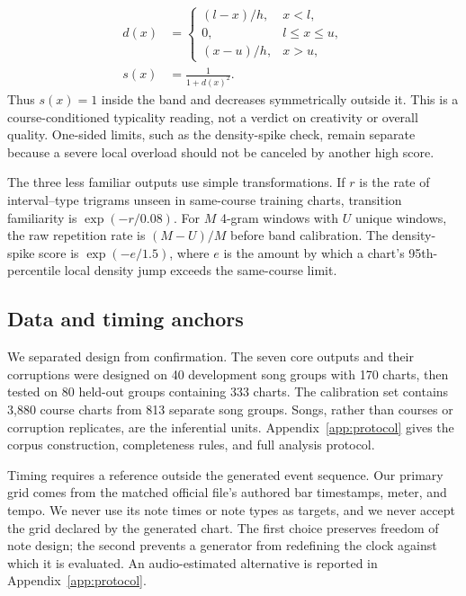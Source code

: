 \documentclass[10pt,twocolumn]{article}
\begin{document}
\begin{equation}
\begin{aligned}
d(x)&=
\begin{cases}
(l-x)/h, & x<l,\\
0,       & l\leq x\leq u,\\
(x-u)/h, & x>u,
\end{cases}\\
s(x)&=\frac{1}{1+d(x)^2}.
\end{aligned}
\label{eq:band}
\end{equation}
Thus $s(x)=1$ inside the band and decreases symmetrically outside it. This is
a course-conditioned typicality reading, not a verdict on creativity or
overall quality. One-sided limits, such as the density-spike check, remain
separate because a severe local overload should not be canceled by another
high score.

The three less familiar outputs use simple transformations. If $r$ is the
rate of interval--type trigrams unseen in same-course training charts,
transition familiarity is $\exp(-r/0.08)$. For $M$ 4-gram windows with $U$
unique windows, the raw repetition rate is $(M-U)/M$ before band calibration.
The density-spike score is $\exp(-e/1.5)$, where $e$ is the amount by which a
chart's 95th-percentile local density jump exceeds the same-course limit.

\subsection{Data and timing anchors}\label{sec:data}

We separated design from confirmation. The seven core outputs and their
corruptions were designed on 40 development song groups with 170 charts, then
tested on 80 held-out groups containing 333 charts. The calibration set
contains 3{,}880 course charts from 813 separate song groups. Songs, rather
than courses or corruption replicates, are the inferential units.
Appendix~\ref{app:protocol} gives the corpus construction, completeness rules,
and full analysis protocol.

Timing requires a reference outside the generated event sequence. Our primary
grid comes from the matched official file's authored bar timestamps, meter,
and tempo. We never use its note times or note types as targets, and we never
accept the grid declared by the generated chart. The first choice preserves
freedom of note design; the second prevents a generator from redefining the
clock against which it is evaluated. An audio-estimated alternative is
reported in Appendix~\ref{app:protocol}.
\end{document}
